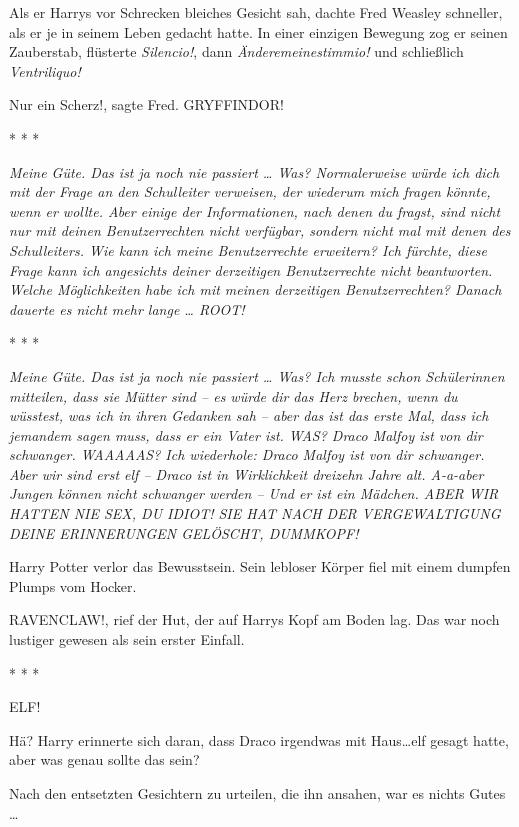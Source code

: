Als er Harrys vor Schrecken bleiches Gesicht sah, dachte Fred Weasley schneller,
als er je in seinem Leben gedacht hatte. In einer einzigen Bewegung zog er
seinen Zauberstab, flüsterte \emph{\glqq Silencio!\grqq{}}, dann \emph{\glqq
Änderemeinestimmio!\grqq{} } und schließlich \emph{\glqq Ventriliquo!\grqq{} }

\glqq Nur ein Scherz!\grqq{}, sagte Fred. \glqq GRYFFINDOR!\grqq{}

* * *

\emph{\glqq Meine Güte. Das ist ja noch nie passiert …\grqq{}
Was? \glqq Normalerweise würde ich dich mit der Frage an den Schulleiter
verweisen, der wiederum mich fragen könnte, wenn er wollte. Aber einige der
Informationen, nach denen du fragst, sind nicht nur mit deinen Benutzerrechten
nicht verfügbar, sondern nicht mal mit denen des Schulleiters.\grqq{} Wie kann
ich meine Benutzerrechte erweitern? \glqq Ich fürchte, diese Frage kann ich
angesichts deiner derzeitigen Benutzerrechte nicht beantworten.\grqq{} Welche
Möglichkeiten habe \emph{ich mit meinen derzeitigen Benutzerrechten?} Danach
dauerte es nicht mehr lange … \glqq ROOT!\grqq{}}

* * *

\emph{\glqq Meine Güte. Das ist ja noch nie passiert …\grqq{}
Was? \glqq Ich musste schon Schülerinnen mitteilen, dass sie Mütter sind – es
würde dir das Herz brechen, wenn du wüsstest, was ich in ihren Gedanken sah –
aber das ist das erste Mal, dass ich jemandem sagen muss, dass er ein Vater
ist.\grqq{} WAS? \glqq Draco Malfoy ist von dir schwanger.\grqq{} WAAAAAS? \glqq
Ich wiederhole: Draco Malfoy ist von dir schwanger.\grqq{} Aber wir sind erst
elf – \glqq Draco ist in Wirklichkeit dreizehn Jahre alt.\grqq{} A-a-aber Jungen
können nicht schwanger werden – \glqq Und er ist ein Mädchen.\grqq{} ABER WIR
HATTEN NIE SEX, DU IDIOT! \glqq SIE HAT NACH DER VERGEWALTIGUNG DEINE
ERINNERUNGEN GELÖSCHT, DUMMKOPF!\grqq{} }

Harry Potter verlor das Bewusstsein. Sein lebloser Körper fiel mit einem dumpfen
Plumps vom Hocker.

\glqq RAVENCLAW!\grqq{}, rief der Hut, der auf Harrys Kopf am Boden lag. Das war
noch lustiger gewesen als sein erster Einfall.

* * *

\glqq ELF!\grqq{}

Hä? Harry erinnerte sich daran, dass Draco irgendwas mit \glqq Haus…elf\grqq{}
gesagt hatte, aber was genau sollte das sein?

Nach den entsetzten Gesichtern zu urteilen, die ihn ansahen, war es nichts Gutes
…

